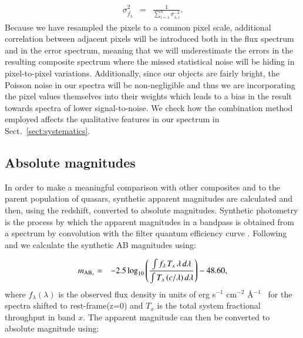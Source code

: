 \documentclass{aa}    %
\newcommand{\eqlabel}[1]{\label{eq:#1}}
\newcommand{\sectionname}{Sect.}
\newcommand{\Sect}[1]{\sectionname~\ref{sect:#1}}
\newcommand{\sect}[1]{\Sect{#1}}
\newcommand{\sectlabel}[1]{\label{sect:#1}}
\newcommand{\fluxunit}{erg s$^{-1}$ cm$^{-2}$ \AA$^{-1}$}
\begin{document}
\begin{eqnarray} \eqlabel{sigma-wmean}
\sigma_{\bar{f_{\lambda}}}^2 &=& \frac{ 1 }{\sum_{i=1}^n \sigma_{\lambda, i}^{-2}}.
\end{eqnarray}
Because we have resampled the pixels to a common pixel scale, additional correlation between adjacent pixels will be introduced both in the flux spectrum and in the error spectrum, meaning that we will underestimate the errors in the resulting composite spectrum where the missed statistical noise will be hiding in pixel-to-pixel variations. Additionally, since our objects are fairly bright, the Poisson noise in our spectra will be non-negligible and thus we are incorporating the pixel values themselves into their weights which leads to a bias in the result towards spectra of lower signal-to-noise. We check how the combination method employed affects the qualitative features in our spectrum in \sect{systematics}.

\subsection{Absolute magnitudes} \sectlabel{absmag}

In order to make a meaningful comparison with other composites and to the parent population of quasars, synthetic apparent magnitudes are calculated and then, using the redshift, converted to absolute magnitudes. Synthetic photometry is the process by which the apparent magnitudes in a bandpass is obtained from a spectrum by convolution with the filter quantum efficiency curve \citep{Bessell2005}. Following \citet{Bessell2012} and \citet{Casagrande2014} we calculate the synthetic AB magnitudes using:

\begin{eqnarray}\eqlabel{abmag}
m_{\textmd{AB}_x} &=& -2.5 \log_{10} \left(  \frac{\int f_\lambda \,  T_{x}  \, \lambda \,  d\lambda} 
{\int  T_{x} \,  (c / \lambda) \,  d\lambda} \right) - 48.60,
\end{eqnarray}
where $f_\lambda (\lambda)$ is the observed flux density in units of \fluxunit~ for the spectra shifted to rest-frame(z=0) and $T_{x} $ is the total system fractional throughput in band $x$. The apparent magnitude can then be converted to absolute magnitude using:
\end{document}
